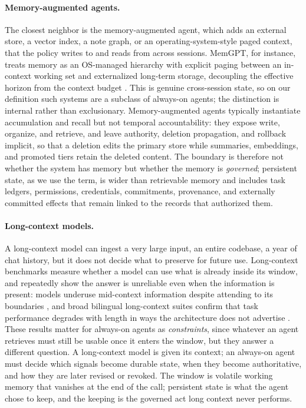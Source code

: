 \paragraph{Memory-augmented agents.} The closest neighbor is the memory-augmented agent, which adds an external store, a vector index, a note graph, or an operating-system-style paged context, that the policy writes to and reads from across sessions. MemGPT, for instance, treats memory as an OS-managed hierarchy with explicit paging between an in-context working set and externalized long-term storage, decoupling the effective horizon from the context budget \citep{packer2024memgptllmsoperatingsystems}. This is genuine cross-session state, so on our definition such systems are a subclass of always-on agents; the distinction is internal rather than exclusionary. Memory-augmented agents typically instantiate accumulation and recall but not temporal accountability: they expose write, organize, and retrieve, and leave authority, deletion propagation, and rollback implicit, so that a deletion edits the primary store while summaries, embeddings, and promoted tiers retain the deleted content. The boundary is therefore not whether the system has memory but whether the memory is \emph{governed}; persistent state, as we use the term, is wider than retrievable memory and includes task ledgers, permissions, credentials, commitments, provenance, and externally committed effects that remain linked to the records that authorized them.

\paragraph{Long-context models.} A long-context model can ingest a very large input, an entire codebase, a year of chat history, but it does not decide what to preserve for future use. Long-context benchmarks measure whether a model can use what is already inside its window, and repeatedly show the answer is unreliable even when the information is present: models underuse mid-context information despite attending to its boundaries \citep{liu2023lostmiddlelanguagemodels}, and broad bilingual long-context suites confirm that task performance degrades with length in ways the architecture does not advertise \citep{bai2024longbenchbilingualmultitaskbenchmark}. These results matter for always-on agents as \emph{constraints}, since whatever an agent retrieves must still be usable once it enters the window, but they answer a different question. A long-context model is given its context; an always-on agent must decide which signals become durable state, when they become authoritative, and how they are later revised or revoked. The window is volatile working memory that vanishes at the end of the call; persistent state is what the agent chose to keep, and the keeping is the governed act long context never performs.

